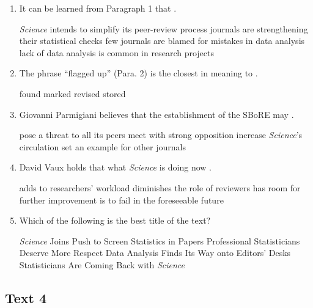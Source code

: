 \begin{enumerate}[resume]
	\item
It can be learned from Paragraph 1 that \lineread.


\fourchoices
{\emph{Science} intends to simplify its peer-review process}
{journals are strengthening their statistical checks}
{few journals are blamed for mistakes in data analysis}
{lack of data analysis is common in research projects}


\item
The phrase ``flagged up'' (Para. 2) is the closest in
meaning to \lineread.



\fourchoices
{found}
{marked}
{revised}
{stored}




\item
Giovanni Parmigiani believes that the establishment of the
SBoRE may \lineread.


\fourchoices
{pose a threat to all its peers}
{meet with strong opposition}
{increase \emph{Science}'s circulation}
{set an example for other journals}



\item
 David Vaux holds that what \emph{Science} is doing
	now \lineread.


\fourchoices
{adds to researchers' workload}
{diminishes the role of reviewers}
{has room for further improvement}
{is to fail in the foreseeable future}



\item
Which of the following is the best title of the text?


\fourchoices
{\emph{Science} Joins Push to Screen Statistics in Papers}
{Professional Statisticians Deserve More Respect}
{Data Analysis Finds Its Way onto Editors' Desks}
{Statisticians Are Coming Back with \emph{Science}}


\end{enumerate}


\newpage
\subsection{Text 4}


